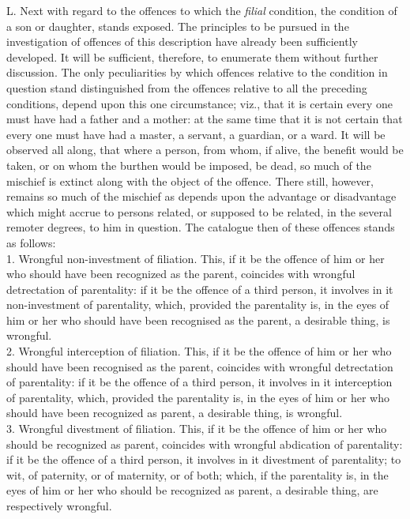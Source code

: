 \documentclass[12pt]{report}
\begin{document}
L. Next with regard to the offences to which the \emph{filial}
condition, the condition of a son or daughter, stands exposed. The
principles to be pursued in the investigation of offences of this
description have already been sufficiently developed. It will be
sufficient, therefore, to enumerate them without further discussion. The
only peculiarities by which offences relative to the condition in
question stand distinguished from the offences relative to all the
preceding conditions, depend upon this one circumstance; viz., that it
is certain every one must have had a father and a mother: at the same
time that it is not certain that every one must have had a master, a
servant, a guardian, or a ward. It will be observed all along, that
where a person, from whom, if alive, the benefit would be taken, or on
whom the burthen would be imposed, be dead, so much of the mischief is
extinct along with the object of the offence. There still, however,
remains so much of the mischief as depends upon the advantage or
disadvantage which might accrue to persons related, or supposed to be
related, in the several remoter degrees, to him in question. The
catalogue then of these offences stands as follows:\\
1. Wrongful non-investment of filiation. This, if it be the offence of
him or her who should have been recognized as the parent, coincides with
wrongful detrectation of parentality: if it be the offence of a third
person, it involves in it non-investment of parentality, which, provided
the parentality is, in the eyes of him or her who should have been
recognised as the parent, a desirable thing, is wrongful.\\
2. Wrongful interception of filiation. This, if it be the offence of him
or her who should have been recognised as the parent, coincides with
wrongful detrectation of parentality: if it be the offence of a third
person, it involves in it interception of parentality, which, provided
the parentality is, in the eyes of him or her who should have been
recognized as parent, a desirable thing, is wrongful.\\
3. Wrongful divestment of filiation. This, if it be the offence of him
or her who should be recognized as parent, coincides with wrongful
abdication of parentality: if it be the offence of a third person, it
involves in it divestment of parentality; to wit, of paternity, or of
maternity, or of both; which, if the parentality is, in the eyes of him
or her who should be recognized as parent, a desirable thing, are
respectively wrongful.\\
\end{document}
